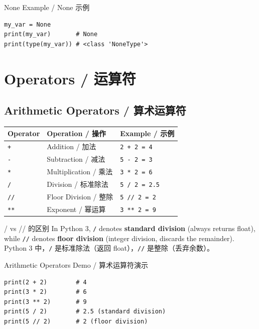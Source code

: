 \documentclass[11pt,a4paper]{report}
\let\oldtexttt\texttt
\renewcommand{\texttt}[1]{\textcolor{mainblue}{\oldtexttt{#1}}}
\begin{document}
\begin{examplebox}{None Example / None 示例}
\begin{lstlisting}
my_var = None
print(my_var)       # None
print(type(my_var)) # <class 'NoneType'>
\end{lstlisting}
\end{examplebox}

\section{Operators / 运算符}

\subsection{Arithmetic Operators / 算术运算符}

\medskip
\centering
\renewcommand{\arraystretch}{1.5}
\begin{tabular}{@{}lll@{}}
\toprule
\textbf{Operator} & \textbf{Operation / 操作} & \textbf{Example / 示例} \\ \midrule
\texttt{+}  & Addition / 加法          & \texttt{2 + 2 = 4} \\
\texttt{-}  & Subtraction / 减法       & \texttt{5 - 2 = 3} \\
\texttt{*}  & Multiplication / 乘法    & \texttt{3 * 2 = 6} \\
\texttt{/}  & Division / 标准除法      & \texttt{5 / 2 = 2.5} \\
\texttt{//} & Floor Division / 整除    & \texttt{5 // 2 = 2} \\
\texttt{**} & Exponent / 幂运算        & \texttt{3 ** 2 = 9} \\ \bottomrule
\end{tabular}
\medskip

\begin{warning}{/ vs // 的区别}
    In Python 3, \texttt{/} denotes \textbf{standard division} (always returns float), while \texttt{//} denotes \textbf{floor division} (integer division, discards the remainder). \\
    Python 3 中，\texttt{/} 是标准除法（返回 float），\texttt{//} 是整除（丢弃余数）。
\end{warning}

\begin{examplebox}{Arithmetic Operators Demo / 算术运算符演示}
\begin{lstlisting}
print(2 + 2)        # 4
print(3 * 2)        # 6
print(3 ** 2)       # 9
print(5 / 2)        # 2.5 (standard division)
print(5 // 2)       # 2 (floor division)
\end{lstlisting}
\end{examplebox}
\end{document}
